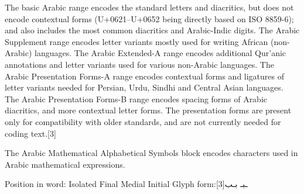 The basic Arabic range encodes the standard letters and diacritics, but does not encode contextual forms (U+0621–U+0652 being directly based on ISO 8859-6); and also includes the most common diacritics and Arabic-Indic digits. The Arabic Supplement range encodes letter variants mostly used for writing African (non-Arabic) languages. The Arabic Extended-A range encodes additional Qur'anic annotations and letter variants used for various non-Arabic languages. The Arabic Presentation Forms-A range encodes contextual forms and ligatures of letter variants needed for Persian, Urdu, Sindhi and Central Asian languages. The Arabic Presentation Forms-B range encodes spacing forms of Arabic diacritics, and more contextual letter forms. The presentation forms are present only for compatibility with older standards, and are not currently needed for coding text.[3] 

The Arabic Mathematical Alphabetical Symbols block encodes characters used in Arabic mathematical expressions.


Position in word:	Isolated	Final	Medial	Initial
Glyph form:\scalebox{3}[3]{ب}{ـب}‎	ـبـ‎	 \scalebox{3}{بـ}





